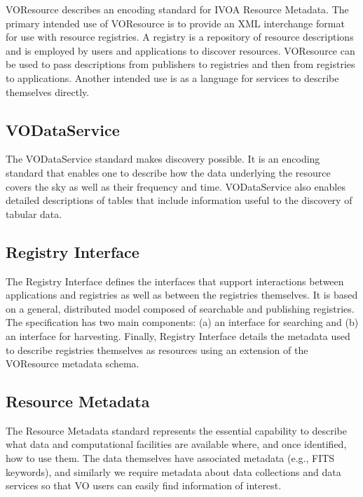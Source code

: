 \documentclass[11pt,a4paper]{ivoa}
\begin{document}
VOResource \citep{2018ivoa.spec.0625P} describes an encoding standard for IVOA Resource Metadata. The primary intended use of 
VOResource is to provide an XML interchange format for use with resource registries. A registry is 
a repository of resource descriptions and is employed by users and applications to discover resources. 
VOResource can be used to pass descriptions from publishers to registries and then from registries to 
applications. Another intended use is as a language for services to describe themselves directly.

\subsection{VODataService}

The VODataService \citep{2010ivoa.spec.1202P} standard makes discovery possible.  It is an encoding standard that enables one to 
describe how the data underlying the resource covers the sky as well as their frequency and time. 
VODataService also enables detailed descriptions of tables that include information useful to the 
discovery of tabular data. 

\subsection{Registry Interface}

The Registry Interface \citep{2018ivoa.spec.0723D} defines the interfaces that support interactions between applications and 
registries as well as between the registries themselves.  It is based on a general, distributed 
model composed of searchable and publishing registries. The specification has two main components: 
(a) an interface for searching and (b) an interface for harvesting.  Finally, Registry Interface 
details the metadata used to describe registries themselves as resources using an extension of the 
VOResource metadata schema.

\subsection{Resource Metadata}

The Resource Metadata \citep{2007ivoa.spec.0302H} standard represents the essential capability to describe what data and 
computational facilities are available where, and once identified, how to use them.  The data 
themselves have associated metadata (e.g., FITS keywords), and similarly we require metadata 
about data collections and data services so that VO users can easily find information of interest.  
\end{document}
